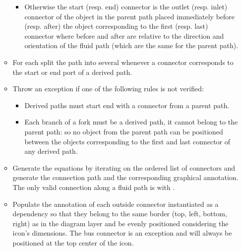 \documentclass[letterpaper,10pt, openany,english]{sphinxmanual}
\begin{document}
\begin{itemize}
\begin{itemize}
\begin{itemize}
\item {} 
Otherwise the start (resp. end) connector is the outlet (resp. inlet) connector of the object in the parent path placed immediately before (resp. after) the object corresponding to the first (resp. last) connector \textendash{} where before and after are relative to the direction and orientation of the fluid path (which are the same for the parent path).

\end{itemize}

\item {} 
For each  split the path into several  whenever a connector corresponds to the start or end port of a derived path.

\item {} 
Throw an exception if one of the following rules is not verified:
\begin{itemize}
\item {} 
Derived paths must start  end with a connector from a parent path.

\item {} 
Each branch of a fork must be a derived path, it cannot belong to the parent path: so no object from the parent path can be positioned between the objects corresponding to the first and last connector of any derived path.

\end{itemize}

\item {} 
Generate the  equations by iterating on the ordered list of connectors and generate the connection path and the corresponding graphical annotation. The only valid connection along a fluid path is  with .

\item {} 
Populate the  annotation of each outside connector instantiated as a dependency so that they belong to the same border (top, left, bottom, right) as in the diagram layer and be evenly positioned considering the icon’s dimensions. The bus connector is an exception and will always be positioned at the top center of the icon.

\end{itemize}

\end{itemize}
\end{document}

